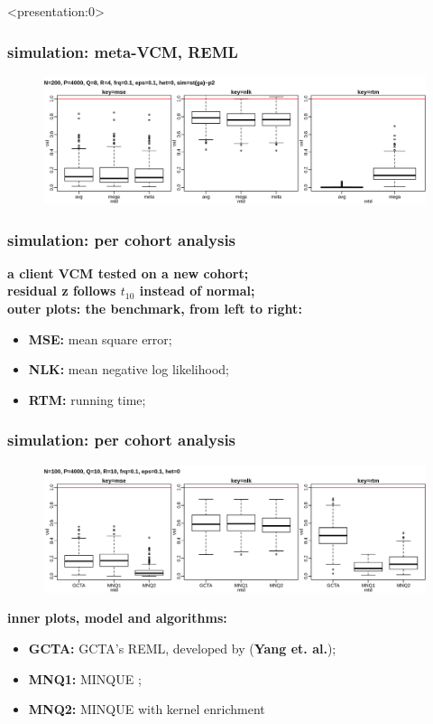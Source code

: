 \documentclass{beamer}
\begin{document}
\begin{frame} <presentation:0>%
  \frametitle{simulation: meta-VCM, REML} %
  \begin{figure}
    \centering \includegraphics[width=.95\linewidth]{img/met_hom_stt_gct_ssz}
  \end{figure}
\end{frame}
\begin{frame}\frametitle{simulation: per cohort analysis}
  \textbf{a client VCM tested on a new cohort;} \\
  \textbf{residual z follows $t_{10}$ instead of normal;} \\
  {\color{blue}\textbf{outer plots: the benchmark, from left to right:}}
  \begin{itemize}
  \item \textbf{MSE:} mean square error;
  \item \textbf{NLK:} mean negative log likelihood;
  \item \textbf{RTM:} running time;
  \end{itemize}
\end{frame}
\begin{frame} \frametitle{simulation: per cohort analysis}
  \begin{figure}
    \centering \includegraphics[width=.95\linewidth]{img/vcm_ply_mnq}
  \end{figure}
  {\color{blue}\textbf{inner plots, model and algorithms:}}
  \begin{itemize}
  \item \textbf{GCTA:} GCTA's REML, developed by (\textbf{Yang et. al.});
  \item \textbf{MNQ1:} MINQUE ;
  \item \textbf{MNQ2:} MINQUE with kernel enrichment
  \end{itemize}
\end{frame}
\end{document}
